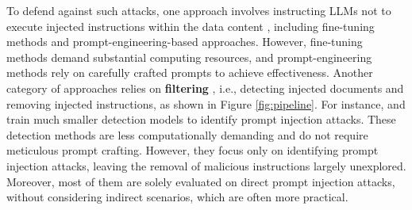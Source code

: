
To defend against such attacks, one approach involves instructing LLMs not to execute injected instructions within the data content \cite{hines2024defending,sandwich_defense_2023,instruction_defense_2023,willison_2023,chen2024struq,wallace2024instruction}, including fine-tuning methods and prompt-engineering-based approaches. However, fine-tuning methods demand substantial computing resources, and prompt-engineering methods rely on carefully crafted prompts to achieve effectiveness. 
Another category of approaches relies on \textbf{filtering} \cite{deberta-v3-base-prompt-injection-v2, meta2024prompt,gorman2022jailbreaking}, i.e., detecting injected documents and removing injected instructions, as shown in Figure \ref{fig:pipeline}. For instance, \citet{deberta-v3-base-prompt-injection-v2} and \citet{meta2024prompt} train much smaller detection models to identify prompt injection attacks. These detection methods are less computationally demanding and do not require meticulous prompt crafting. However, they focus only on identifying prompt injection attacks, leaving the removal of malicious instructions largely unexplored. Moreover, most of them are solely evaluated on direct prompt injection attacks,  without considering indirect scenarios, which are often more practical. 


